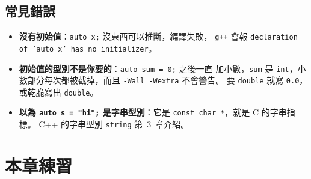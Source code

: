 \subsection{常見錯誤}

\begin{itemize}
\item \textbf{沒有初始值}：\texttt{auto x;} 沒東西可以推斷，編譯失敗，
\texttt{g++} 會報 \texttt{declaration of 'auto x' has no initializer}。
\item \textbf{初始值的型別不是你要的}：\texttt{auto sum = 0;} 之後一直
加小數，\texttt{sum} 是 \texttt{int}，小數部分每次都被截掉，而且
\texttt{-Wall -Wextra} 不會警告。 要 \texttt{double} 就寫
\texttt{0.0}，或乾脆寫出 \texttt{double}。
\item \textbf{以為 \texttt{auto s = "hi";} 是字串型別}：它是
\texttt{const char *}，就是 C 的字串指標。 C++ 的字串型別
\texttt{string} 第~3~章介紹。
\end{itemize}

\section{本章練習}
\label{sec:ch2-exercises}


